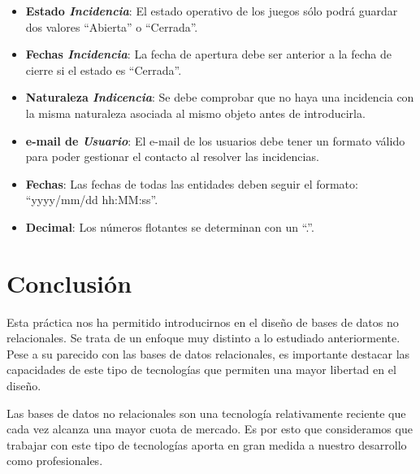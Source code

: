 \documentclass[]{article}
\begin{document}
\begin{itemize}
    \item \textbf{Estado \textit{Incidencia}}: El estado operativo de los juegos sólo podrá guardar dos valores ``Abierta'' o ``Cerrada''.
    \item \textbf{Fechas \textit{Incidencia}}: La fecha de apertura debe ser anterior a la fecha de cierre si el estado es ``Cerrada''.
    \item \textbf{Naturaleza \textit{Indicencia}}: Se debe comprobar que no haya una incidencia con la misma naturaleza asociada al mismo objeto antes de introducirla.
    \item \textbf{e-mail de \textit{Usuario}}: El e-mail de los usuarios debe tener un formato válido para poder gestionar el contacto al resolver las incidencias.
    \item \textbf{Fechas}: Las fechas de todas las entidades deben seguir el formato: ``yyyy/mm/dd hh:MM:ss''.
    \item \textbf{Decimal}: Los números flotantes se determinan con un ``.''.
\end{itemize}

\newpage
\section{Conclusión}
\label{sec:conclusion}

Esta práctica nos ha permitido introducirnos en el diseño de bases de datos no relacionales. Se trata de un enfoque muy distinto a lo estudiado anteriormente. Pese a su parecido con las bases de datos relacionales, es importante destacar las capacidades de este tipo de tecnologías que permiten una mayor libertad en el diseño.

Las bases de datos no relacionales son una tecnología relativamente reciente que cada vez alcanza una mayor cuota de mercado. Es por esto que consideramos que trabajar con este tipo de tecnologías aporta en gran medida a nuestro desarrollo como profesionales.
\end{document}
